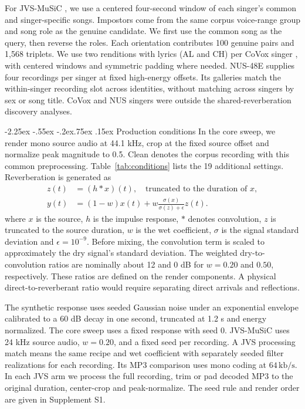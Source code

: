 \documentclass[10pt,a4paper]{article}
\makeatletter
\renewcommand\subsection{\@startsection{subsection}{2}{\z@}%
  {-2.25ex \@plus -.55ex \@minus -.2ex}{.75ex \@plus .15ex}%
  {\normalfont\normalsize\sffamily\bfseries}}
\newcommand{\kbs}{\,\mathrm{kb/s}}
\makeatother
\begin{document}
For JVS-MuSiC \cite{jvs}, we use a centered four-second window of each singer's common and singer-specific songs. Impostors come from the same corpus voice-range group and song role as the genuine candidate. We first use the common song as the query, then reverse the roles. Each orientation contributes 100 genuine pairs and 1,568 triplets. We use two renditions with lyrics (AL and CH) per CoVox singer \cite{covox}, with centered windows and symmetric padding where needed. NUS-48E \cite{nus} supplies four recordings per singer at fixed high-energy offsets. Its galleries match the within-singer recording slot across identities, without matching across singers by sex or song title. CoVox and NUS singers were outside the shared-reverberation discovery analyses.

\subsection{Production conditions}
In the core sweep, we render mono source audio at 44.1 kHz, crop at the fixed source offset and normalize peak magnitude to 0.5. Clean denotes the corpus recording with this common preprocessing. Table~\ref{tab:conditions} lists the 19 additional settings. Reverberation is generated as
\begin{equation}
 \begin{aligned}
 z(t)&=(h*x)(t),\quad\text{truncated to the duration of }x,\\
 y(t)&=(1-w)x(t)+w\frac{\sigma(x)}{\sigma(z)+\epsilon}z(t).
 \end{aligned}
 \label{eq:render}
\end{equation}
where $x$ is the source, $h$ is the impulse response, $*$ denotes convolution, $z$ is truncated to the source duration, $w$ is the wet coefficient, $\sigma$ is the signal standard deviation and $\epsilon=10^{-9}$. Before mixing, the convolution term is scaled to approximately the dry signal's standard deviation. The weighted dry-to-convolution ratios are nominally about 12 and 0 dB for $w=0.20$ and $0.50$, respectively. These ratios are defined on the render components. A physical direct-to-reverberant ratio would require separating direct arrivals and reflections.

The synthetic response uses seeded Gaussian noise under an exponential envelope calibrated to a 60 dB decay in one second, truncated at 1.2 s and energy normalized. The core sweep uses a fixed response with seed 0. JVS-MuSiC uses 24 kHz source audio, $w=0.20$, and a fixed seed per recording. A JVS processing match means the same recipe and wet coefficient with separately seeded filter realizations for each recording. Its MP3 comparison uses mono coding at $64\kbs$. In each JVS arm we process the full recording, trim or pad decoded MP3 to the original duration, center-crop and peak-normalize. The seed rule and render order are given in Supplement S1.
\end{document}
